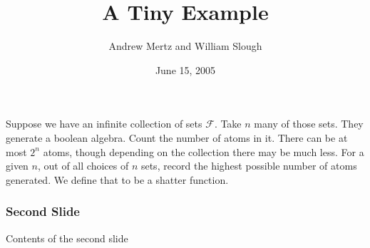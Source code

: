 \documentclass{beamer}
\title{A Tiny Example}
\author{Andrew Mertz and William Slough}
\date{June 15, 2005}
\newcommand{\F}{\mathcal F}
\begin{document}
\maketitle

\begin{frame}
	Suppose we have an infinite collection of sets $\F$.
	Take $n$ many of those sets.
	They generate a boolean algebra.
	Count the number of atoms in it.
	There can be at most $2^n$ atoms, though depending on the collection there may be much less.
	For a given $n$, out of all choices of $n$ sets, record the highest possible number of atoms generated.
	We define that to be a shatter function.
\end{frame}

\begin{frame}
	\frametitle{Second Slide}
	Contents of the second slide
\end{frame}
\end{document}
